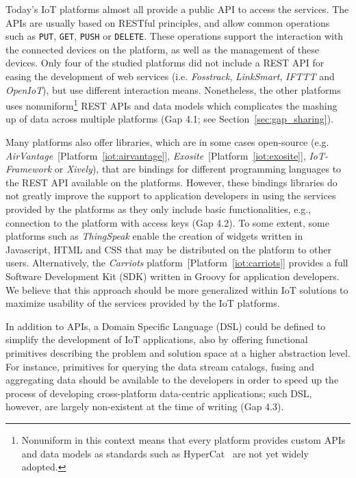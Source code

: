 \documentclass[preprint,10pt,5p]{elsarticle}
\newcommand{\citeiot}[1]{[Platform~\ref{#1}]}
\begin{document}
Today's IoT platforms almost all provide a public API to access the services.
The APIs are usually based on RESTful principles, 
and allow common operations such as \texttt{PUT}, \texttt{GET}, \texttt{PUSH} or \texttt{DELETE}. 
These operations support the interaction with the connected devices on the
platform, as well as the management of these devices. 
Only four of the studied platforms did not include a REST API for easing the
development of web services (i.e. \emph{Fosstrack},
\emph{LinkSmart\textsuperscript{\texttrademark}},
\emph{IFTTT} and \emph{OpenIoT}), but use different interaction means.
Nonetheless, the other platforms uses nonuniform\footnote{Nonuniform
  in this context means that every platform provides custom APIs and
  data models as standards such as HyperCat~\cite{Burt2014} are not
  yet widely adopted.} REST APIs and data models which complicates the
mashing up of data across multiple platforms (Gap 4.1; see 
Section~\ref{sec:gap_sharing}).

Many platforms also offer libraries, which are in some cases open-source (e.g.
\emph{AirVantage\textsuperscript{\texttrademark}}~\citeiot{iot:airvantage},
\emph{Exosite}~\citeiot{iot:exosite}, \emph{IoT-Framework} or
\emph{Xively}), that are bindings for different programming languages
to the REST API available on the platforms.
However, these bindings libraries do not greatly improve the support to
application developers in using the services provided by the platforms as they
only include basic functionalities, e.g., connection to the platform with access
keys (Gap 4.2).
To some extent, some platforms such as \emph{ThingSpeak} enable the creation of 
widgets written in Javascript, HTML and CSS that may be distributed on the
platform to other users.
Alternatively, the \emph{Carriots\textsuperscript{\textregistered}}
platform~\citeiot{iot:carriots} provides a full
Software Development Kit (SDK) written in Groovy for application developers. 
We believe that this approach should be more generalized within IoT solutions to
maximize usability of the services provided by the IoT platforms.

In addition to APIs, a Domain Specific Language (DSL) could be defined 
to simplify the development of IoT applications, also by offering functional 
primitives describing the problem and solution space at a higher abstraction level. 
For instance, primitives for querying the data stream catalogs, fusing and 
aggregating data should be available to the developers in order to speed up the
process of developing cross-platform data-centric applications; such DSL, however,
are largely non-existent at the time of writing (Gap 4.3).
\end{document}

